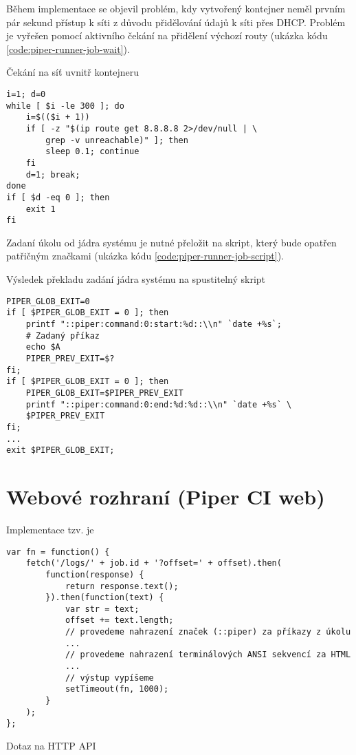 Během implementace se objevil problém, kdy vytvořený kontejner neměl prvním pár sekund přístup k síti z důvodu přidělování údajů k síti přes DHCP.
Problém je vyřešen pomocí aktivního čekání na přidělení výchozí routy (ukázka kódu \ref{code:piper-runner-job-wait}).

\begin{listing}[ht]
\caption{\label{code:piper-runner-job-wait}Čekání na síť uvnitř kontejneru}
\begin{verbatim}
i=1; d=0
while [ $i -le 300 ]; do
    i=$(($i + 1))
    if [ -z "$(ip route get 8.8.8.8 2>/dev/null | \
        grep -v unreachable)" ]; then
        sleep 0.1; continue
    fi
    d=1; break;
done
if [ $d -eq 0 ]; then
    exit 1
fi
\end{verbatim}
\end{listing}

Zadaní úkolu od jádra systému je nutné přeložit na skript, který bude opatřen patřičným značkami (ukázka kódu \ref{code:piper-runner-job-script}).

\begin{listing}[ht]
\caption{\label{code:piper-runner-job-script}Výsledek překladu zadání jádra systému na spustitelný skript}
\begin{verbatim}
PIPER_GLOB_EXIT=0
if [ $PIPER_GLOB_EXIT = 0 ]; then
    printf "::piper:command:0:start:%d::\\n" `date +%s`;
    # Zadaný příkaz
    echo $A
    PIPER_PREV_EXIT=$?
fi;
if [ $PIPER_GLOB_EXIT = 0 ]; then
    PIPER_GLOB_EXIT=$PIPER_PREV_EXIT
    printf "::piper:command:0:end:%d:%d::\\n" `date +%s` \
    $PIPER_PREV_EXIT
fi;
...
exit $PIPER_GLOB_EXIT;
\end{verbatim}
\end{listing}

\section{Webové rozhraní (Piper CI web)}

Implementace tzv.  je 

\begin{listing}[ht]
\begin{verbatim}
var fn = function() {
    fetch('/logs/' + job.id + '?offset=' + offset).then(
        function(response) {
            return response.text();
        }).then(function(text) {
            var str = text;
            offset += text.length;
            // provedeme nahrazení značek (::piper) za příkazy z úkolu
            ...
            // provedeme nahrazení terminálových ANSI sekvencí za HTML
            ...
            // výstup vypíšeme
            setTimeout(fn, 1000);
        }
    );
};
\end{verbatim}
\caption{Dotaz na HTTP API}
\end{listing}


